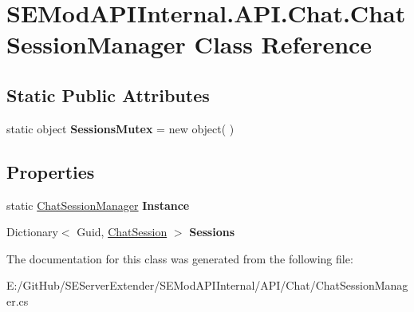 \hypertarget{class_s_e_mod_a_p_i_internal_1_1_a_p_i_1_1_chat_1_1_chat_session_manager}{}\section{S\+E\+Mod\+A\+P\+I\+Internal.\+A\+P\+I.\+Chat.\+Chat\+Session\+Manager Class Reference}
\label{class_s_e_mod_a_p_i_internal_1_1_a_p_i_1_1_chat_1_1_chat_session_manager}
\subsection*{Static Public Attributes}
\begin{DoxyCompactItemize}
\item 
\hypertarget{class_s_e_mod_a_p_i_internal_1_1_a_p_i_1_1_chat_1_1_chat_session_manager_a506c64c01956162c70d73dfef384f673}{}static object {\bfseries Sessions\+Mutex} = new object( )\label{class_s_e_mod_a_p_i_internal_1_1_a_p_i_1_1_chat_1_1_chat_session_manager_a506c64c01956162c70d73dfef384f673}

\end{DoxyCompactItemize}
\subsection*{Properties}
\begin{DoxyCompactItemize}
\item 
\hypertarget{class_s_e_mod_a_p_i_internal_1_1_a_p_i_1_1_chat_1_1_chat_session_manager_aca8dee51359a1b5ff0e2d7140c74ff55}{}static \hyperlink{class_s_e_mod_a_p_i_internal_1_1_a_p_i_1_1_chat_1_1_chat_session_manager}{Chat\+Session\+Manager} {\bfseries Instance}\label{class_s_e_mod_a_p_i_internal_1_1_a_p_i_1_1_chat_1_1_chat_session_manager_aca8dee51359a1b5ff0e2d7140c74ff55}

\item 
\hypertarget{class_s_e_mod_a_p_i_internal_1_1_a_p_i_1_1_chat_1_1_chat_session_manager_a5e0ca6e5b0d79a11407ed488128f07b1}{}Dictionary$<$ Guid, \hyperlink{class_s_e_mod_a_p_i_internal_1_1_a_p_i_1_1_chat_1_1_chat_session}{Chat\+Session} $>$ {\bfseries Sessions}\label{class_s_e_mod_a_p_i_internal_1_1_a_p_i_1_1_chat_1_1_chat_session_manager_a5e0ca6e5b0d79a11407ed488128f07b1}

\end{DoxyCompactItemize}


The documentation for this class was generated from the following file\+:\begin{DoxyCompactItemize}
\item 
E\+:/\+Git\+Hub/\+S\+E\+Server\+Extender/\+S\+E\+Mod\+A\+P\+I\+Internal/\+A\+P\+I/\+Chat/Chat\+Session\+Manager.\+cs\end{DoxyCompactItemize}
